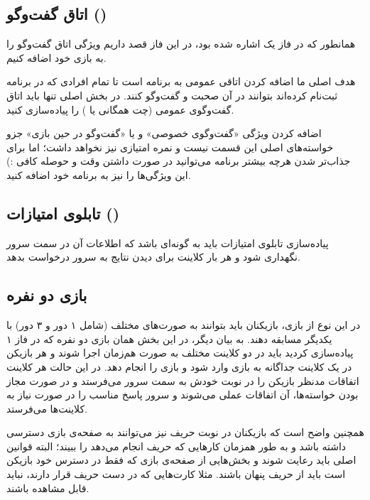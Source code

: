 \documentclass[]{article}
\begin{document}
\subsection*{{\titr اتاق گفت‌وگو ()}}

همانطور که در فاز یک اشاره شده بود، در این فاز قصد داریم ویژگی اتاق گفت‌وگو را به بازی خود اضافه کنیم.

هدف اصلی ما اضافه کردن اتاقی عمومی به برنامه است تا تمام افرادی که در برنامه ثبت‌نام کرده‌اند بتوانند در آن صحبت و گفت‌وگو کنند. در بخش اصلی تنها باید
اتاق گفت‌وگوی عمومی (چت همگانی یا )
را پیاده‌سازی کنید.
\\

\begin{tcolorbox}[colback=green!5!white,colframe=green!75!black,title=\textbf{نکته}]
    اضافه کردن ویژگی «گفت‌و‌گوی خصوصی» و یا «گفت‌وگو در حین بازی» جزو خواسته‌های اصلی این قسمت نیست و نمره امتیازی نیز نخواهد داشت؛ اما برای جذاب‌تر شدن هرچه بیشتر برنامه می‌توانید در صورت داشتن وقت و حوصله کافی :) این ویژگی‌ها را نیز به برنامه خود اضافه کنید.
\end{tcolorbox}


\subsection*{{\titr تابلوی امتیازات ()}}

پیاده‌سازی تابلوی امتیازات باید به گونه‌ای باشد که اطلاعات آن در سمت سرور نگهداری شود و هر بار کلاینت برای دیدن نتایج به سرور درخواست بدهد.

\subsection*{{\titr بازی دو نفره}}
در این نوع از بازی، بازیکنان باید بتوانند به صورت‌های مختلف (شامل ۱ دور و ۳ دور) با یکدیگر مسابقه دهند. به بیان دیگر، در این بخش همان بازی دو نفره که در فاز ۱ پیاده‌سازی کردید باید در دو کلاینت مختلف به صورت هم‌زمان اجرا شوند و هر بازیکن در یک کلاینت جداگانه به بازی وارد شود و بازی را انجام دهد. در این حالت هر کلاینت اتفاقات مدنظر بازیکن را در نوبت خودش به سمت سرور می‌فرستد و در صورت مجاز بودن خواسته‌ها، آن اتفاقات عملی می‌شوند و سرور پاسخ مناسب را در صورت نیاز به کلاینت‌ها می‌فرستد.

همچنین واضح است که بازیکنان در نوبت حریف نیز می‌توانند به صفحه‌ی بازی دسترسی داشته باشد و به طور همزمان کارهایی که حریف انجام می‌دهد را ببیند؛ البته قوانین اصلی باید رعایت شوند و بخش‌هایی از صفحه‌ی بازی که فقط در دسترس خود بازیکن است باید از حریف پنهان باشند. مثلا کارت‌هایی که در دست حریف قرار دارند، نباید قابل مشاهده باشند.
\end{document}
